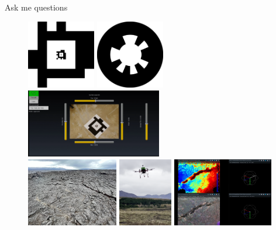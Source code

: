 \documentclass[aspectratio=169]{beamer}
\begin{document}
\begin{frame}{Ask me questions}
	\vspace{0.5cm}
	\begin{figure}[]
	    \centering
		\vfill
		\includegraphics[height=3cm]{./images/tagCustom24h10_00002_00001_00000}
		\hfill
		\includegraphics[height=3cm]{./images/whycode_20_8}
		\hfill
		\includegraphics[height=3cm]{./images/demo_screenshot}\\
		\vspace{0.5cm}
		\includegraphics[height=3cm]{./images/lava_smooth}
		\hfill
		\includegraphics[height=3cm]{./images/depth_drone_flying}
		\hfill
		\includegraphics[height=3cm]{./images/depth_data}
		\vfill
	\end{figure}
\end{frame}
\end{document}

